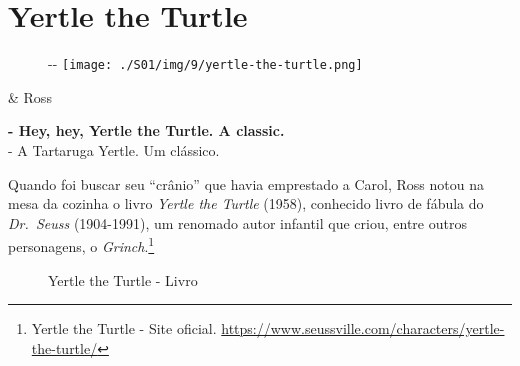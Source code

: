 \hypertarget{yertle-the-turtle}{%
\section{Yertle the Turtle}\label{yertle-the-turtle}}

\begin{figure}[!ht]
  \begin{adjustwidth}{-\oddsidemargin-1in}{-\rightmargin}
    \centering
    \texttt{[image: ./S01/img/9/yertle-the-turtle.png]}
  \end{adjustwidth}
\end{figure}

\begin{tcolorbox}[enhanced,center upper,
    drop fuzzy shadow southeast, boxrule=0.3pt,
    lower separated=false, breakable,
    colframe=black!30!dialogoBorder,colback=white]
\begin{minipage}[c]{0.16\linewidth}
   & \centering \scriptsize{Ross}
\end{minipage}
\hfill
\begin{minipage}[c]{0.8\linewidth}
  \textbf{- Hey, hey, Yertle the Turtle. A classic.}\\
  - A Tartaruga Yertle. Um clássico.
\end{minipage}
\end{tcolorbox}

\saveparinfos
\noindent
\begin{minipage}[c]{0.5\textwidth}\useparinfo

Quando foi buscar seu ``crânio'' que havia emprestado a Carol, Ross
notou na mesa da cozinha o livro \emph{Yertle the Turtle} (1958),
conhecido livro de fábula do \emph{Dr.~Seuss} (1904-1991), um renomado
autor infantil que criou, entre outros personagens, o
\emph{Grinch}.\footnote{\sloppy Yertle the Turtle - Site oficial. \url{https://www.seussville.com/characters/yertle-the-turtle/}}

\end{minipage}\hfill
\begin{minipage}[c]{0.5\textwidth}

\begin{figure}
  \centering
    \caption{Yertle the Turtle - Livro\label{fig:yertle-the-turtle-livro}}
\end{figure}

\end{minipage}

